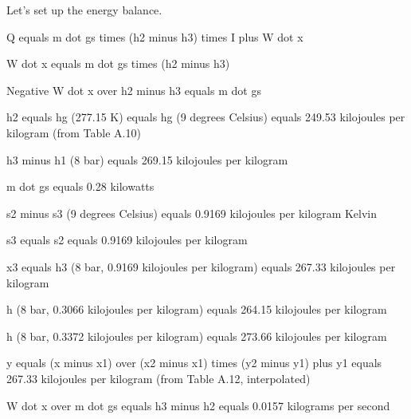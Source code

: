 Let's set up the energy balance.

Q equals m dot gs times (h2 minus h3) times I plus W dot x

W dot x equals m dot gs times (h2 minus h3)

Negative W dot x over h2 minus h3 equals m dot gs

h2 equals hg (277.15 K) equals hg (9 degrees Celsius) equals 249.53 kilojoules per kilogram (from Table A.10)

h3 minus h1 (8 bar) equals 269.15 kilojoules per kilogram

m dot gs equals 0.28 kilowatts

s2 minus s3 (9 degrees Celsius) equals 0.9169 kilojoules per kilogram Kelvin

s3 equals s2 equals 0.9169 kilojoules per kilogram

x3 equals h3 (8 bar, 0.9169 kilojoules per kilogram) equals 267.33 kilojoules per kilogram

h (8 bar, 0.3066 kilojoules per kilogram) equals 264.15 kilojoules per kilogram

h (8 bar, 0.3372 kilojoules per kilogram) equals 273.66 kilojoules per kilogram

y equals (x minus x1) over (x2 minus x1) times (y2 minus y1) plus y1 equals 267.33 kilojoules per kilogram (from Table A.12, interpolated)

W dot x over m dot gs equals h3 minus h2 equals 0.0157 kilograms per second